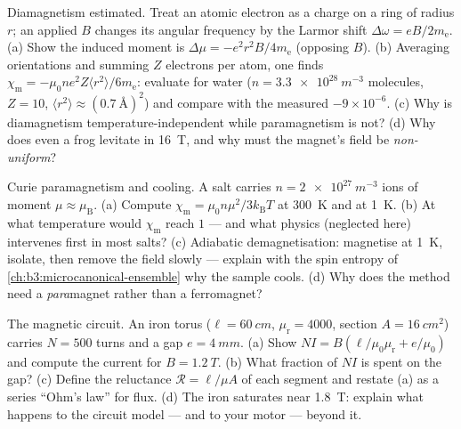 \begin{exercise}[$\star\star$]\label{exo:b3:electromagnetism-in-matter:8}
Diamagnetism estimated. Treat an atomic electron as a charge on a
ring of radius $r$; an applied $B$ changes its angular frequency by
the Larmor shift $\Delta\omega = eB/2m_{\text{e}}$. (a) Show the
induced moment is $\Delta\mu = -e^2r^2B/4m_{\text{e}}$ (opposing
$B$). (b) Averaging orientations and summing $Z$ electrons per
atom, one finds $\chi_{\text{m}} = -\mu_0ne^2Z\langle
r^2\rangle/6m_{\text{e}}$: evaluate for water ($n =
\qty{3.3e28}{m^{-3}}$ molecules, $Z = 10$, $\langle r^2\rangle
\approx (\qty{0.7}{\angstrom})^2$) and compare with the measured
$-9\times10^{-6}$. (c) Why is diamagnetism temperature-independent
while paramagnetism is not? (d) Why does even a frog levitate in
\qty{16}{T}, and why must the magnet's field be \emph{non-uniform}?
\end{exercise}

\begin{exercise}[$\star\star$]\label{exo:b3:electromagnetism-in-matter:9}
Curie paramagnetism and cooling. A salt carries $n =
\qty{2e27}{m^{-3}}$ ions of moment $\mu \approx \mu_{\text{B}}$.
(a) Compute $\chi_{\text{m}} = \mu_0n\mu^2/3k_{\text{B}}T$ at
\qty{300}{K} and at \qty{1}{K}. (b) At what temperature would
$\chi_{\text{m}}$ reach $1$ --- and what physics (neglected here)
intervenes first in most salts? (c) Adiabatic demagnetisation:
magnetise at \qty{1}{K}, isolate, then remove the field slowly ---
explain with the spin entropy of
\cref{ch:b3:microcanonical-ensemble} why the sample cools. (d) Why
does the method need a \emph{para}magnet rather than a ferromagnet?
\end{exercise}

\begin{exercise}[$\star\star\star$]\label{exo:b3:electromagnetism-in-matter:10}
The magnetic circuit. An iron torus ($\ell = \qty{60}{cm}$,
$\mu_{\text{r}} = 4000$, section $A = \qty{16}{cm^2}$) carries
$N = 500$ turns and a gap $e = \qty{4}{mm}$. (a) Show $NI =
B(\ell/\mu_0\mu_{\text{r}} + e/\mu_0)$ and compute the current for
$B = \qty{1.2}{T}$. (b) What fraction of $NI$ is spent on the gap?
(c) Define the reluctance $\mathcal R = \ell/\mu A$ of each
segment and restate (a) as a series ``Ohm's law'' for flux. (d)
The iron saturates near \qty{1.8}{T}: explain what happens to the
circuit model --- and to your motor --- beyond it.
\end{exercise}

